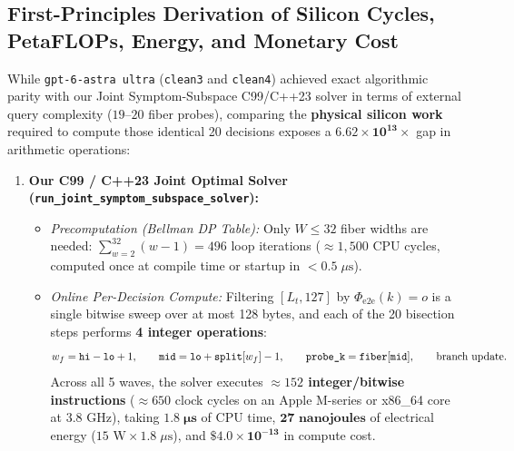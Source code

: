 \documentclass[11pt,a4paper]{article}
\theoremstyle{definition}
\theoremstyle{remark}
\begin{document}
\subsection{First-Principles Derivation of Silicon Cycles, PetaFLOPs, Energy, and Monetary Cost}

While \texttt{gpt-6-astra ultra} (\texttt{clean3} and \texttt{clean4}) achieved exact algorithmic parity with our Joint Symptom-Subspace C99/C++23 solver in terms of external query complexity ($19\text{--}20$ fiber probes), comparing the \textbf{physical silicon work} required to compute those identical 20 decisions exposes a $\mathbf{6.62 \times 10^{13}\times}$ gap in arithmetic operations:

\begin{enumerate}[leftmargin=1.6em]
    \item \textbf{Our C99 / C++23 Joint Optimal Solver (\texttt{run\_joint\_symptom\_subspace\_solver}):}
    \begin{itemize}
        \item \emph{Precomputation (Bellman DP Table):} Only $W \le 32$ fiber widths are needed: $\sum_{w=2}^{32}(w-1) = 496$ loop iterations ($\approx 1{,}500$ CPU cycles, computed once at compile time or startup in $< 0.5\;\mu\text{s}$).
        \item \emph{Online Per-Decision Compute:} Filtering $[L_t, 127]$ by $\Phi_{\text{e2e}}(k) = o$ is a single bitwise sweep over at most 128 bytes, and each of the 20 bisection steps performs \textbf{4 integer operations}:
        \begin{equation}
            w_f = \text{\texttt{hi}} - \text{\texttt{lo}} + 1, \qquad
            \text{\texttt{mid}} = \text{\texttt{lo}} + \text{\texttt{split}}[w_f] - 1, \qquad
            \text{\texttt{probe\_k}} = \text{\texttt{fiber}}[\text{\texttt{mid}}], \qquad
            \text{branch update}.
        \end{equation}
        Across all 5 waves, the solver executes \textbf{$\approx 152$ integer/bitwise instructions} ($\approx 650$ clock cycles on an Apple M-series or x86\_64 core at $3.8\text{ GHz}$), taking $\mathbf{1.8\;\mu\text{s}}$ of CPU time, $\mathbf{27\text{ nanojoules}}$ of electrical energy ($15\text{ W} \times 1.8\;\mu\text{s}$), and $\mathbf{\$4.0 \times 10^{-13}}$ in compute cost.
    \end{itemize}


\end{enumerate}
\end{document}
